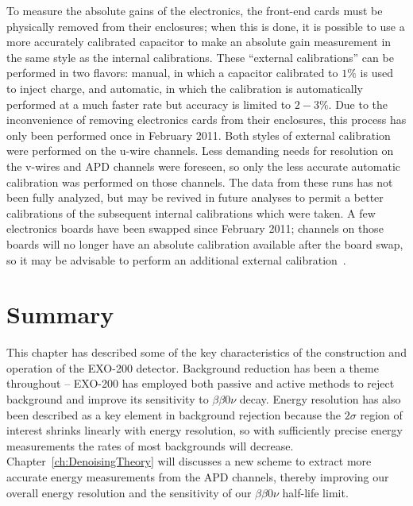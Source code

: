 To measure the absolute gains of the electronics, the front-end cards must be physically removed from their enclosures; when this is done, it is possible to use a more accurately calibrated capacitor to make an absolute gain measurement in the same style as the internal calibrations.  These ``external calibrations'' can be performed in two flavors: manual, in which a capacitor calibrated to $1\%$ is used to inject charge, and automatic, in which the calibration is automatically performed at a much faster rate but accuracy is limited to $2-3\%$.  Due to the inconvenience of removing electronics cards from their enclosures, this process has only been performed once in February 2011.  Both styles of external calibration were performed on the u-wire channels.  Less demanding needs for resolution on the v-wires and APD channels were foreseen, so only the less accurate automatic calibration was performed on those channels.  The data from these runs has not been fully analyzed, but may be revived in future analyses to permit a better calibrations of the subsequent internal calibrations which were taken.  A few electronics boards have been swapped since February 2011; channels on those boards will no longer have an absolute calibration available after the board swap, so it may be advisable to perform an additional external calibration~\cite{EnergyDocumentRun2a}.

\section{Summary}

This chapter has described some of the key characteristics of the construction and operation of the EXO-200 detector.  Background reduction has been a theme throughout -- EXO-200 has employed both passive and active methods to reject background and improve its sensitivity to $\beta\beta 0\nu$ decay.  Energy resolution has also been described as a key element in background rejection because the $2\sigma$ region of interest shrinks linearly with energy resolution, so with sufficiently precise energy measurements the rates of most backgrounds will decrease.  Chapter~\ref{ch:DenoisingTheory} will discusses a new scheme to extract more accurate energy measurements from the APD channels, thereby improving our overall energy resolution and the sensitivity of our $\beta\beta 0\nu$ half-life limit.
